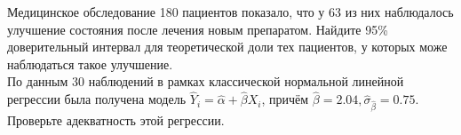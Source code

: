 \documentclass[addpoints, answers]{exam} %
\begin{document}
\begin{questions}
\question Медицинское обследование 180 пациентов показало, что у 63 из них наблюдалось улучшение состояния после лечения новым препаратом. Найдите 95\% доверительный интервал для теоретической доли тех пациентов, у которых може наблюдаться такое улучшение.\\
\question По данным 30 наблюдений в рамках классической нормальной линейной регрессии была получена модель $\hat{Y}_i=\hat{\alpha}+\hat{\beta}X_i$, причём $\hat{\beta}=2.04, \hat{\sigma}_{\hat{\beta}}=0.75$. Проверьте адекватность этой регрессии.
\end{questions}
\end{document}

